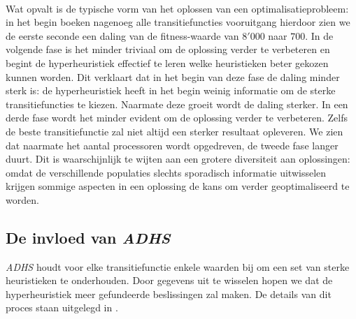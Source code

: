 \paragraph{}
Wat opvalt is de typische vorm van het oplossen van een optimalisatieprobleem: in het begin boeken nagenoeg alle transitiefuncties vooruitgang hierdoor zien we de eerste seconde een daling van de fitness-waarde van $8'000$ naar $700$. In de volgende fase is het minder triviaal om de oplossing verder te verbeteren en begint de hyperheuristiek effectief te leren welke heuristieken beter gekozen kunnen worden. Dit verklaart dat in het begin van deze fase de daling minder sterk is: de hyperheuristiek heeft in het begin weinig informatie om de sterke transitiefuncties te kiezen. Naarmate deze groeit wordt de daling sterker. In een derde fase wordt het minder evident om de oplossing verder te verbeteren. Zelfs de beste transitiefunctie zal niet altijd een sterker resultaat opleveren. We zien dat naarmate het aantal processoren wordt opgedreven, de tweede fase langer duurt. Dit is waarschijnlijk te wijten aan een grotere diversiteit aan oplossingen: omdat de verschillende populaties slechts sporadisch informatie uitwisselen krijgen sommige aspecten in een oplossing de kans om verder geoptimaliseerd te worden.

\subsection{De invloed van \emph{ADHS}}


\emph{ADHS} houdt voor elke transitiefunctie enkele waarden bij om een set van sterke heuristieken te onderhouden. Door gegevens uit te wisselen hopen we dat de hyperheuristiek meer gefundeerde beslissingen zal maken. De details van dit proces staan uitgelegd in .

